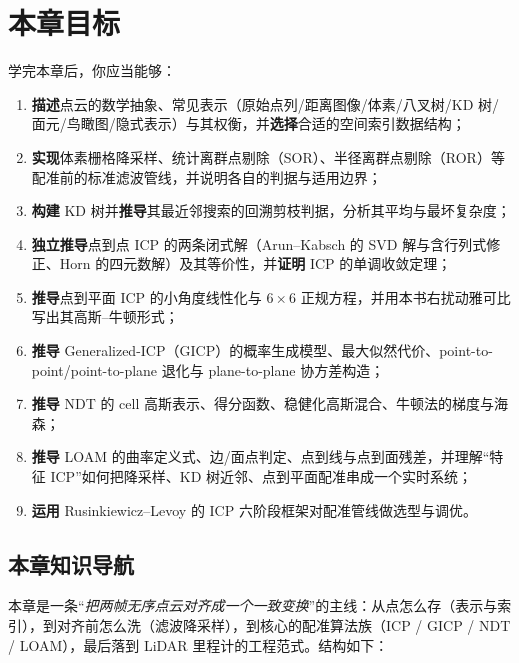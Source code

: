 \section*{本章目标}
学完本章后，你应当能够：
\begin{enumerate}
  \item \textbf{描述}点云的数学抽象、常见表示（原始点列/距离图像/体素/八叉树/KD 树/面元/鸟瞰图/隐式表示）与其权衡，并\textbf{选择}合适的空间索引数据结构；
  \item \textbf{实现}体素栅格降采样、统计离群点剔除（SOR）、半径离群点剔除（ROR）等配准前的标准滤波管线，并说明各自的判据与适用边界；
  \item \textbf{构建} KD 树并\textbf{推导}其最近邻搜索的回溯剪枝判据，分析其平均与最坏复杂度；
  \item \textbf{独立推导}点到点 ICP 的两条闭式解（Arun--Kabsch 的 SVD 解与含行列式修正、Horn 的四元数解）及其等价性，并\textbf{证明} ICP 的单调收敛定理；
  \item \textbf{推导}点到平面 ICP 的小角度线性化与 $6\times6$ 正规方程，并用本书右扰动雅可比写出其高斯--牛顿形式；
  \item \textbf{推导} Generalized-ICP（GICP）的概率生成模型、最大似然代价、point-to-point/point-to-plane 退化与 plane-to-plane 协方差构造；
  \item \textbf{推导} NDT 的 cell 高斯表示、得分函数、稳健化高斯混合、牛顿法的梯度与海森；
  \item \textbf{推导} LOAM 的曲率定义式、边/面点判定、点到线与点到面残差，并理解“特征 ICP”如何把降采样、KD 树近邻、点到平面配准串成一个实时系统；
  \item \textbf{运用} Rusinkiewicz--Levoy 的 ICP 六阶段框架对配准管线做选型与调优。
\end{enumerate}

\subsection*{本章知识导航}
本章是一条“\emph{把两帧无序点云对齐成一个一致变换}”的主线：从点怎么存（表示与索引），到对齐前怎么洗（滤波降采样），到核心的配准算法族（ICP / GICP / NDT / LOAM），最后落到 LiDAR 里程计的工程范式。结构如下：

